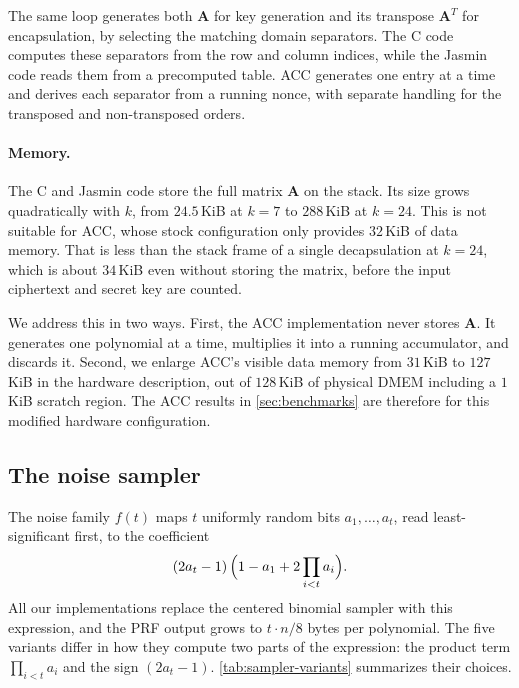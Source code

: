 The same loop generates both $\mathbf{A}$ for key generation and its transpose
$\mathbf{A}^T$ for encapsulation, by selecting the matching domain separators.
The C code computes these separators from the row and column indices, while
the Jasmin code reads them from a precomputed table. ACC generates one entry at a time and 
derives each separator from a running nonce, with separate handling for the transposed and 
non-transposed orders.

\paragraph{Memory.}
The C and Jasmin code store the full matrix $\mathbf{A}$ on the stack. Its size
grows quadratically with $k$, from $24.5$\,KiB at $k=7$ to $288$\,KiB at
$k=24$. This is not suitable for ACC, whose
stock configuration only provides $32$\,KiB of data memory. That is less than the
stack frame of a single decapsulation at $k=24$, which is about $34$\,KiB even without storing
the matrix, before the input ciphertext and secret key are counted.

We address this in two ways. First, the ACC implementation never stores
$\mathbf{A}$. It generates one polynomial at a time, multiplies it into a
running accumulator, and discards it. Second, we enlarge ACC's visible data
memory from $31$\,KiB to $127$\,KiB in the hardware description, out of
$128$\,KiB of physical DMEM including a $1$\,KiB scratch region. The ACC
results in \cref{sec:benchmarks} are therefore for this modified hardware
configuration.

\subsection{The noise sampler}
\label{sec:impl:sampler}

The noise family $f(t)$ maps $t$ uniformly random bits $a_1,\ldots,a_t$, read
least-significant first, to the coefficient
$$(2a_t-1)\,\Bigl(1-a_1+2\prod_{i<t}a_i\Bigr).$$
All our implementations replace the centered binomial sampler with this
expression, and the PRF output grows to $t\cdot n/8$ bytes per polynomial. The
five variants differ in how they compute two parts of the expression: the
product term $\prod_{i<t}a_i$ and the sign $(2a_t-1)$.
\cref{tab:sampler-variants} summarizes their choices.

